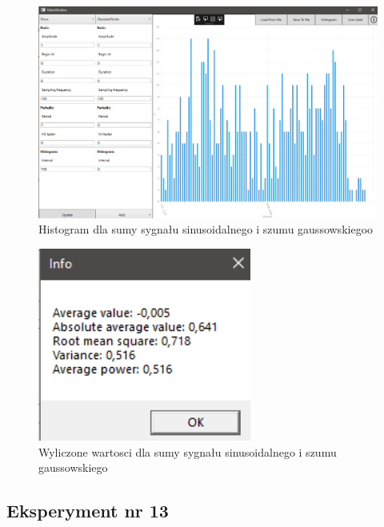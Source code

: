 \documentclass[12pt]{article}
\begin{document}
\begin{figure}[H]
 \centering
 \includegraphics[width=14cm]{images/addsingauss1hist.PNG}
 \vspace{-0.3cm}
 \caption{Histogram dla  sumy sygnału sinusoidalnego i szumu gaussowskiegoo}
 \label{gui}
\end{figure}

\begin{figure}[H]
 \centering
 \includegraphics[width=7cm]{images/addsingauss1info.PNG}
 \vspace{-0.3cm}
 \caption{Wyliczone wartosci dla  sumy sygnału sinusoidalnego i szumu gaussowskiego}
 \label{gui}
\end{figure}



\subsection{Eksperyment nr 13 }
\end{document}
